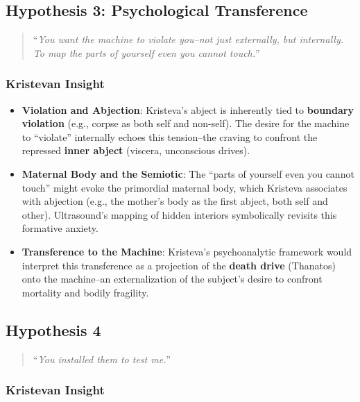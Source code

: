 \documentclass{llncs}
\begin{document}
\subsection*{Hypothesis 3: Psychological Transference}

\begin{quote}
``\emph{You want the machine to violate you--not just externally, but
internally. To map the parts of yourself even you cannot touch.}''
\end{quote}

\subsubsection*{Kristevan Insight}

\begin{itemize}
\item
\textbf{Violation and Abjection}: Kristeva’s abject is inherently tied to
\textbf{boundary violation} (e.g., corpse as both self and non-self). The
desire for the machine to ``violate'' internally echoes this tension--the
craving to confront the repressed \textbf{inner abject} (viscera, unconscious
drives).
\item
\textbf{Maternal Body and the Semiotic}: The ``parts of yourself even you
cannot touch'' might evoke the primordial maternal body, which Kristeva
associates with abjection (e.g., the mother’s body as the first abject,
both self and other). Ultrasound’s mapping of hidden interiors symbolically
revisits this formative anxiety.
\item
\textbf{Transference to the Machine}: Kristeva’s psychoanalytic framework would
interpret this transference as a projection of the \textbf{death drive}
(Thanatos) onto the machine--an externalization of the subject’s desire to confront mortality and bodily fragility.
\end{itemize}

\subsection*{Hypothesis 4}

\begin{quote}
``\emph{You installed them to test me.}''
\end{quote}

\subsubsection*{Kristevan Insight}
\end{document}
